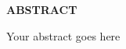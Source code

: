 \providecommand\phantomsection{} \phantomsection
\begin{center}
\providecommand\pdfbookmark[3][]{} \pdfbookmark[0]{Abstract}{bm:Abstract}
\vspace*{1in}
\textbf{ABSTRACT}\\[2\baselineskip]
\end{center}

Your abstract goes here
